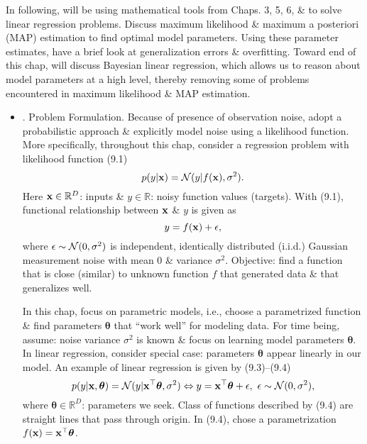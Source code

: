 \documentclass{article}
\begin{document}
\begin{itemize}
\begin{itemize}
	\end{itemize}
	In following, will be using mathematical tools from Chaps. 3, 5, 6, \& to solve linear regression problems. Discuss maximum likelihood \& maximum a posteriori (MAP) estimation to find optimal model parameters. Using these parameter estimates, have a brief look at generalization errors \& overfitting. Toward end of this chap, will discuss Bayesian linear regression, which allows us to reason about model parameters at a high level, thereby removing some of problems encountered in maximum likelihood \& MAP estimation.
	\begin{itemize}
		\item {. Problem Formulation.} Because of presence of observation noise, adopt a probabilistic approach \& explicitly  model noise using a likelihood function. More specifically, throughout this chap, consider a regression problem with likelihood function (9.1)
		\begin{equation}
			p(y|{\bf x}) = {\cal N}(y|f({\bf x}),\sigma^2).
		\end{equation}
		Here ${\bf x}\in\mathbb{R}^D$: inputs \& $y\in\mathbb{R}$: noisy function values (targets). With (9.1), functional relationship between ${\bf x}$ \& $y$ is given as
		\begin{equation}
			y = f({\bf x}) + \epsilon,
		\end{equation}
		where $\epsilon\sim{\cal N}(0,\sigma^2)$ is independent, identically distributed (i.i.d.) Gaussian measurement noise with mean 0 \& variance $\sigma^2$. Objective: find a function that is close (similar) to unknown function $f$ that generated data \& that generalizes well.
		
		In this chap, focus on parametric models, i.e., choose a parametrized function \& find parameters $\boldsymbol{\theta}$ that ``work well'' for modeling data. For time being, assume: noise variance $\sigma^2$ is known \& focus on learning model parameters $\boldsymbol{\theta}$. In linear regression, consider special case: parameters $\boldsymbol{\theta}$ appear linearly in our model. An example of linear regression is given by (9.3)--(9.4)
		\begin{equation}
			p(y|{\bf x},\boldsymbol{\theta}) = {\cal N}(y|{\bf x}^\top\boldsymbol{\theta},\sigma^2)\Leftrightarrow y = {\bf x}^\top\boldsymbol{\theta} + \epsilon,\ \epsilon\sim{\cal N}(0,\sigma^2),
		\end{equation}
		where $\boldsymbol{\theta}\in\mathbb{R}^D$: parameters we seek. Class of functions described by (9.4) are straight lines that pass through origin. In (9.4), chose a parametrization $f({\bf x}) = {\bf x}^\top\boldsymbol{\theta}$.
		

\end{itemize}
\end{itemize}
\end{document}

